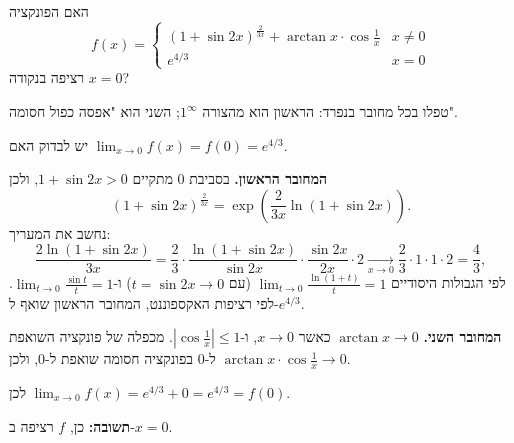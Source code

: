 
\begin{question}
האם הפונקציה
\[
f(x)=\begin{cases}(1+\sin2x)^{\frac{2}{3x}}+\arctan x\cdot\cos\frac1x & x\neq0\\ e^{4/3} & x=0\end{cases}
\]
רציפה בנקודה $x=0$?
\end{question}

\begin{hint}
טפלו בכל מחובר בנפרד: הראשון הוא מהצורה $1^\infty$; השני הוא "אפסה כפול חסומה".
\end{hint}

\begin{solution}
יש לבדוק האם $\lim_{x\to0}f(x)=f(0)=e^{4/3}$.

\textbf{המחובר הראשון.} בסביבת $0$ מתקיים $1+\sin2x>0$, ולכן
\[
(1+\sin2x)^{\frac{2}{3x}}=\exp\left(\frac{2}{3x}\ln(1+\sin2x)\right).
\]
נחשב את המעריך:
\[
\frac{2\ln(1+\sin2x)}{3x}=\frac23\cdot\frac{\ln(1+\sin2x)}{\sin2x}\cdot\frac{\sin2x}{2x}\cdot2\xrightarrow[x\to0]{}\frac23\cdot1\cdot1\cdot2=\frac43,
\]
לפי הגבולות היסודיים $\lim_{t\to0}\frac{\ln(1+t)}{t}=1$ (עם $t=\sin2x\to0$) ו-$\lim_{t\to0}\frac{\sin t}{t}=1$. לפי רציפות האקספוננט, המחובר הראשון שואף ל-$e^{4/3}$.

\textbf{המחובר השני.} $\arctan x\to0$ כאשר $x\to0$, ו-$\left|\cos\frac1x\right|\le1$. מכפלה של פונקציה השואפת ל-$0$ בפונקציה חסומה שואפת ל-$0$, ולכן $\arctan x\cdot\cos\frac1x\to0$.

לכן $\lim_{x\to0}f(x)=e^{4/3}+0=e^{4/3}=f(0)$.

\textbf{תשובה:} כן, $f$ רציפה ב-$x=0$.
\end{solution}
